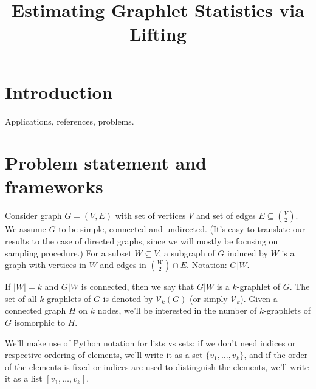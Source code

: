 \documentclass[11pt]{article}
\def\cV{\mathcal{V}}
\theoremstyle{remark}
\theoremstyle{definition}
\begin{document}
\title{Estimating Graphlet Statistics via Lifting}


\date{}

\maketitle

	\begin{abstract}
		\lipsum[1-1]
	\end{abstract}
	
	\section{Introduction}
	\label{sec:intro}
	
	Applications, references, problems.
	
	\section{Problem statement and frameworks}
	\label{sec:background}
	
	Consider graph $G=(V,E)$ with set of vertices $V$ and set of edges $E \subseteq
	\binom{V}{2}$. 
	We assume $G$ to be simple, connected and undirected. 
	(It's easy to translate our results to the case of directed graphs, since we will mostly be 
	focusing on sampling procedure.) 
	For a subset $W \subseteq V$, a subgraph of $G$ induced 
	by $W$ is a graph with vertices in $W$ and edges in $\binom{W}{2}\cap E$. 
	Notation: $G|W$.
	
	If $|W| = k$ and $G|W$ is connected, then we say that $G|W$ is a $k$-graphlet of 
	$G$. The set of all $k$-graphlets of $G$ is denoted by $\cV_k(G)$ (or simply $\cV_k$).
	Given a connected graph $H$ on $k$ nodes, we'll be interested in the number 
	of $k$-graphlets of $G$ isomorphic to $H$.
	
	We'll make use of Python notation for lists vs sets: if we don't need indices or respective
	ordering of elements, we'll write it as a set $\{v_1, \ldots, v_k\}$, and if the 
	order of the elements is fixed or indices are used to distinguish the elements, we'll write 
	it as a list $[v_1,\ldots, v_k]$. 
	
\end{document}
